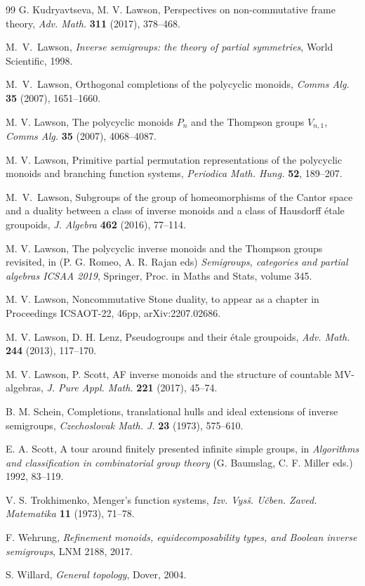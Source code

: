 \documentclass[a4paper]{amsart}
\begin{document}
\begin{thebibliography}{99}
 G. Kudryavtseva, M. V. Lawson, Perspectives on non-commutative frame theory, {\em Adv. Math.} {\bf 311} (2017), 378--468.

 M.~V.~Lawson, {\em Inverse semigroups: the theory of partial symmetries}, World Scientific, 1998.

 M.~V.~Lawson, Orthogonal completions of the polycyclic monoids, {\em Comms Alg.} {\bf 35} (2007),  1651--1660.

 M. V. Lawson, The polycyclic monoids $P_{n}$ and the Thompson groups $V_{n,1}$, {\em Comms Alg.} {\bf 35} (2007), 4068--4087.

 M. V. Lawson, Primitive partial permutation representations of the polycyclic monoids and branching function systems, 
{\em Periodica Math. Hung.} {\bf 52}, 189--207.

 M.~V.~Lawson, Subgroups of the group of homeomorphisms of the Cantor space and a duality 
between a class of inverse monoids and a class of Hausdorff \'etale groupoids, 
{\em J. Algebra} {\bf 462} (2016), 77--114.

 M. V. Lawson, The polycyclic inverse monoids and the Thompson groups revisited, 
in (P. G. Romeo, A. R. Rajan eds) {\em Semigroups, categories and partial algebras ICSAA 2019}, Springer, Proc. in Maths and Stats, volume 345.

 M. V. Lawson, Noncommutative Stone duality, to appear as a chapter in Proceedings ICSAOT-22, 46pp, arXiv:2207.02686.

 M. V. Lawson, D. H. Lenz, Pseudogroups and their \'etale groupoids, {\em Adv. Math.} {\bf 244} (2013), 117--170.

 M. V. Lawson, P. Scott, AF inverse monoids and the structure of countable MV-algebras, {\em J. Pure Appl. Math.} {\bf 221} (2017), 45--74.

 B. M. Schein, Completions, translational hulls and ideal extensions of inverse semigroups, {\em Czechoslovak Math. J.} {\bf 23} (1973), 575--610.

 E. A. Scott, A tour around finitely presented infinite simple groups, in {\em Algorithms and classification in combinatorial group theory}
(G. Baumslag, C. F. Miller eds.) 1992, 83--119.  

 V. S. Trokhimenko, Menger's function systems, {\em Izv. Vys\v{s}. U\v{c}ben. Zaved. Matematika} {\bf 11} (1973), 71--78.

 F. Wehrung, {\em Refinement monoids, equidecomposability types, and Boolean inverse semigroups}, LNM 2188, 2017.

 S. Willard, {\em General topology}, Dover, 2004.


\end{thebibliography}
\end{document}
